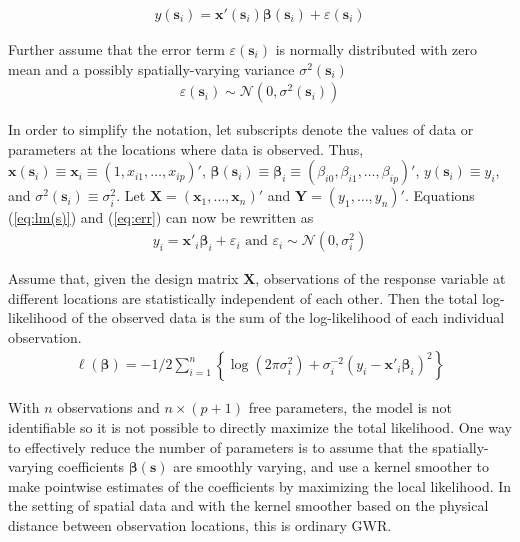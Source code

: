 \documentclass[authoryear, review, 11pt]{elsarticle}
\begin{document}
	\begin{eqnarray}
		y(\bm{s}_i) = \bm{x}'(\bm{s}_i) \bm{\beta}(\bm{s}_i) + \varepsilon(\bm{s}_i)
	\label{eq:lm(s)}
	\end{eqnarray}
	
	Further assume that the error term $\varepsilon(\bm{s}_i)$ is normally distributed with zero mean and a possibly spatially-varying variance $\sigma^2(\bm{s}_i)$
	\begin{eqnarray}
		\varepsilon(\bm{s}_i) \sim \mathcal{N} \left( 0,\sigma^2(\bm{s}_i) \right)
	\label{eq:err}
	\end{eqnarray}
	
	In order to simplify the notation, let subscripts denote the values of data or parameters at the locations where data is observed. Thus, $\bm{x}(\bm{s}_i) \equiv \bm{x}_i \equiv \left( 1, x_{i1}, \dots, x_{ip} \right)'$, $\bm{\beta}(\bm{s}_i) \equiv \bm{\beta}_i \equiv \left(\beta_{i0}, \beta_{i1}, \dots, \beta_{ip} \right)'$, $y(\bm{s}_i) \equiv y_i$, and $\sigma^2(\bm{s}_i) \equiv \sigma^2_i$. Let $\bm{X} = \left( \bm{x}_1, \dots, \bm{x}_n \right)'$ and $\bm{Y} = \left( y_1, \dots, y_n \right)'$. Equations (\ref{eq:lm(s)}) and (\ref{eq:err}) can now be rewritten as
	\begin{eqnarray}
		y_i = \bm{x}'_i \bm{\beta}_i + \varepsilon_i \text{ and } \varepsilon_i \sim \mathcal{N} \left( 0,\sigma_i^2 \right)
	\end{eqnarray}
	
	Assume that, given the design matrix $\bm{X}$, observations of the response variable at different locations are statistically independent of each other. Then the total log-likelihood of the observed data is the sum of the log-likelihood of each individual observation.
	 \begin{eqnarray}
	 	\ell\left( \bm{\beta} \right) = - 1/2 \sum_{i=1}^n \left\{  \log \left( 2 \pi \sigma^2_i\right) +  \sigma^{-2}_i  \left(y_i - \bm{x}'_i\bm{\beta}_i \right)^2  \right\}
	\end{eqnarray}
	
	With $n$ observations and $n \times (p+1)$ free parameters, the model is not identifiable so it is not possible to directly maximize the total likelihood. One way to effectively reduce the number of parameters is to assume that the spatially-varying coefficients $\bm{\beta}(\bm{s})$ are smoothly varying, and use a kernel smoother to make pointwise estimates of the coefficients by maximizing the local likelihood. In the setting of spatial data and with the kernel smoother based on the physical distance between observation locations, this is ordinary GWR.
		
\end{document}
